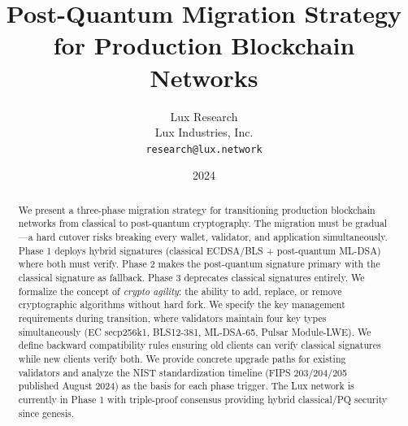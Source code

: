 \documentclass[11pt,a4paper]{article}
\title{Post-Quantum Migration Strategy\\for Production Blockchain Networks}
\author{
Lux Research \\
Lux Industries, Inc.\\
\texttt{research@lux.network}
}
\date{2024}
\begin{document}
\luxcoverpage

\begin{abstract}
We present a three-phase migration strategy for transitioning production blockchain networks from classical to post-quantum cryptography. The migration must be gradual---a hard cutover risks breaking every wallet, validator, and application simultaneously. Phase 1 deploys hybrid signatures (classical ECDSA/BLS + post-quantum ML-DSA) where both must verify. Phase 2 makes the post-quantum signature primary with the classical signature as fallback. Phase 3 deprecates classical signatures entirely. We formalize the concept of \emph{crypto agility}: the ability to add, replace, or remove cryptographic algorithms without hard fork. We specify the key management requirements during transition, where validators maintain four key types simultaneously (EC secp256k1, BLS12-381, ML-DSA-65, Pulsar Module-LWE). We define backward compatibility rules ensuring old clients can verify classical signatures while new clients verify both. We provide concrete upgrade paths for existing validators and analyze the NIST standardization timeline (FIPS 203/204/205 published August 2024) as the basis for each phase trigger. The Lux network is currently in Phase 1 with triple-proof consensus providing hybrid classical/PQ security since genesis.
\end{abstract}












\end{document}
